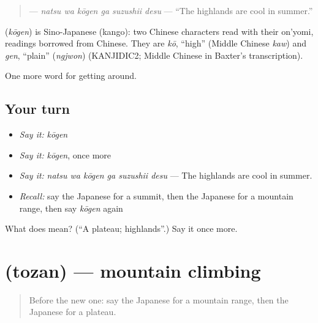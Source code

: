 \begin{quote}
\textbf{  } — \emph{natsu wa kōgen ga suzushii desu} — \textquotedblleft{}The highlands are cool in summer.\textquotedblright{}
\end{quote}

\begin{cousinweb}
\textbf{} (\emph{kōgen}) is Sino-Japanese (kango): two Chinese characters read with their on'yomi, readings borrowed from Chinese. They are \emph{kō}, \textquotedblleft{}high\textquotedblright{} (Middle Chinese \emph{kaw}) and \emph{gen}, \textquotedblleft{}plain\textquotedblright{} (\emph{ngjwon}) (KANJIDIC2; Middle Chinese in Baxter's transcription).
\end{cousinweb}

\begin{grammarlens}[title={What you've built}]
One more word for getting around.
\end{grammarlens}

\subsection*{Your turn}
\begin{itemize}
\raggedright
  \item \emph{Say it:} \emph{kōgen}
  \item \emph{Say it:} \emph{kōgen}, once more
  \item \emph{Say it:} \emph{natsu wa kōgen ga suzushii desu} — The highlands are cool in summer.
  \item \emph{Recall:} say the Japanese for a summit, then the Japanese for a mountain range, then say \emph{kōgen} again
\end{itemize}

\begin{tcolorbox}[breakable,colback=teal!4,colframe=teal!35!black,title={Before you move on}]
What does  mean? (\textquotedblleft{}A plateau; highlands\textquotedblright{}.) Say it once more.
\end{tcolorbox}
\section[\texorpdfstring{\ja{とざん} (tozan)}{とざん (tozan)}]{ (tozan) — mountain climbing}

\label{lesson:JA-C412-tozan}



\begin{quote}
Before the new one: say the Japanese for a mountain range, then the Japanese for a plateau.
\end{quote}

